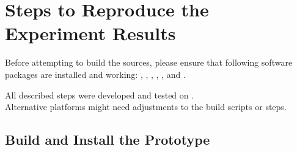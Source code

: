 \chapter{Steps to Reproduce the Experiment Results}
\label{app:reproduce}

Before attempting to build the sources, please ensure that following software packages are installed and working:
, , , , , and .

All described steps were developed and tested on
.\\
Alternative platforms might need adjustments to the build scripts or steps.


\section{Build and Install the Prototype}
\label{app:reproduce:build}

